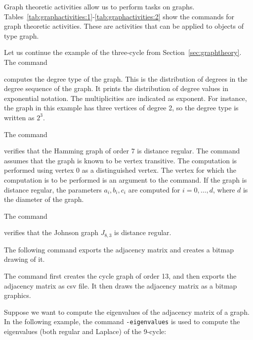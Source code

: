 Graph theoretic activities allow us to perform tasks on graphs.
Tables~\ref{tab:graphactivities:1}-\ref{tab:graphactivities:2}
show the commands for graph theoretic activities.
These are activities that can be applied to objects of type graph. 


\bigskip

Let us continue the example of the three-cycle 
from Section~\ref{sec:graphtheory}. 
The command 


computes the degree type of the graph. 
This is the distribution of degrees in the degree sequence of the graph.
It prints the distribution of degree values in exponential notation. 
The multiplicities are indicated as exponent. 
For instance, the graph in this example has three vertices of degree 2, 
so the degree type is written as $2^3.$

\bigskip


The command 


verifies that the Hamming graph of order $7$ is distance regular. 
The command assumes that the graph is known to be vertex transitive. 
The computation is performed using vertex $0$ as a distinguished vertex. 
The vertex for which the computation is to be performed is an argument to the command.
If the graph is distance regular, the parameters $a_i,b_i,c_i$ are computed 
for $i =0,\ldots,d$, where $d$ is the diameter of the graph.


\bigskip

The command 


verifies that the Johnson graph $J_{8,3}$ is distance regular. 



\bigskip


The following command
exports the adjacency matrix and creates a bitmap drawing of it.


The command first creates the cycle graph of order 13, 
and then exports the adjacency matrix as 
csv file. 
It then draws the adjacency matrix as a bitmap graphics. 

\bigskip

Suppose we want to compute the eigenvalues 
of the adjacency matrix of a graph.
In the following example, 
the command \verb'-eigenvalues' is used to compute 
the eigenvalues (both regular and Laplace) 
of the 9-cycle: 

